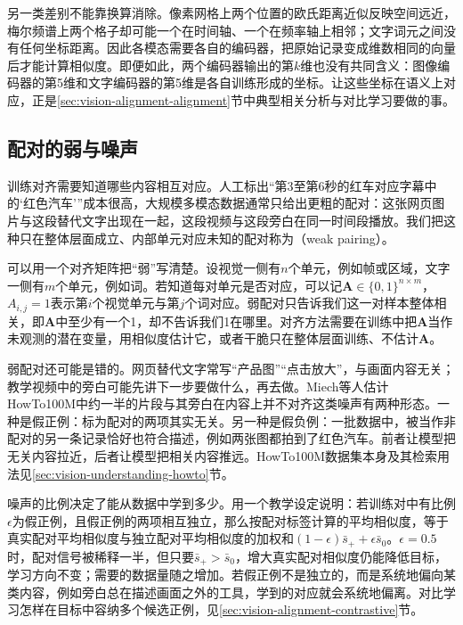 另一类差别不能靠换算消除。像素网格上两个位置的欧氏距离近似反映空间远近，梅尔频谱上两个格子却可能一个在时间轴、一个在频率轴上相邻；文字词元之间没有任何坐标距离。因此各模态需要各自的编码器，把原始记录变成维数相同的向量后才能计算相似度。即便如此，两个编码器输出的第$k$维也没有共同含义：图像编码器的第5维和文字编码器的第5维是各自训练形成的坐标。让这些坐标在语义上对应，正是\ref{sec:vision-alignment-alignment}节中典型相关分析与对比学习要做的事。

\subsection{配对的弱与噪声}
\label{sec:vision-alignment-weak-pairing}

训练对齐需要知道哪些内容相互对应。人工标出“第3至第6秒的红车对应字幕中的‘红色汽车’”成本很高，大规模多模态数据通常只给出更粗的配对：这张网页图片与这段替代文字出现在一起，这段视频与这段旁白在同一时间段播放。我们把这种只在整体层面成立、内部单元对应未知的配对称为（weak pairing）。

可以用一个对齐矩阵把“弱”写清楚。设视觉一侧有$n$个单元，例如帧或区域，文字一侧有$m$个单元，例如词。若知道每对单元是否对应，可以记$\bm A\in\{0,1\}^{n\times m}$，$A_{i,j}=1$表示第$i$个视觉单元与第$j$个词对应。弱配对只告诉我们这一对样本整体相关，即$\bm A$中至少有一个1，却不告诉我们1在哪里。对齐方法需要在训练中把$\bm A$当作未观测的潜在变量，用相似度估计它，或者干脆只在整体层面训练、不估计$\bm A$。

弱配对还可能是错的。网页替代文字常写“产品图”“点击放大”，与画面内容无关；教学视频中的旁白可能先讲下一步要做什么，再去做。Miech等人估计HowTo100M中约一半的片段与其旁白在内容上并不对齐这类噪声有两种形态。一种是假正例：标为配对的两项其实无关。另一种是假负例：一批数据中，被当作非配对的另一条记录恰好也符合描述，例如两张图都拍到了红色汽车。前者让模型把无关内容拉近，后者让模型把相关内容推远。HowTo100M数据集本身及其检索用法见\ref{sec:vision-understanding-howto}节。

噪声的比例决定了能从数据中学到多少。用一个教学设定说明：若训练对中有比例$\epsilon$为假正例，且假正例的两项相互独立，那么按配对标签计算的平均相似度，等于真实配对平均相似度与独立配对平均相似度的加权和$(1-\epsilon)\bar s_{+}+\epsilon\bar s_{0}$。$\epsilon=0.5$时，配对信号被稀释一半，但只要$\bar s_{+}>\bar s_{0}$，增大真实配对相似度仍能降低目标，学习方向不变；需要的数据量随之增加。若假正例不是独立的，而是系统地偏向某类内容，例如旁白总在描述画面之外的工具，学到的对应就会系统地偏离。对比学习怎样在目标中容纳多个候选正例，见\ref{sec:vision-alignment-contrastive}节。

